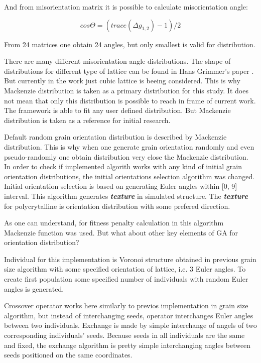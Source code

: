 \documentclass[12pt]{report}
\begin{document}
And from misorientation matrix it is possible to calculate misorientation angle:

\begin{equation} \label{misangle}
cos\Theta = (trace(\Delta g_{1,2}) - 1)/2
\end{equation}
\bigbreak

From 24 matrices one obtain 24 angles, but only smallest is valid for distribution.

There are many different misorientation angle distributions. The shape of distributions for different type of lattice can be found in Hans Grimmer's paper \cite{hans79}. But currently in the work just cubic lattice is beeing considered. This is why Mackenzie distribution \cite{mack58} is taken as a primary distribution for this study. It does not mean that only this distribution is possible to reach in frame of current work. The framework is able to fit any user defined distribution. But Mackenzie distribution is taken as a reference for initial research. 

Default random grain orientation distribution is described by Mackenzie distribution. This is why when one generate grain orientation randomly and even pseudo-randomly one obtain distribution very close the Mackenzie distribution. In order to check if implemented algorith works with any kind of initial grain orientation distributions, the initial orientations selection algorithm was changed. Initial orientation selection is based on generating Euler angles within [0\degree, 9\degree] interval. This algorithm generates \textit{\textbf{texture}} in simulated structure. The \textit{\textbf{texture}} for polycrytalline is orientation distribution with some prefered direction.

As one can understand, for fitness penalty calculation in this algorithm Mackenzie function was used. But what about other key elements of GA for orientation distribution? 

Individual for this implementation is Voronoi structure obtained in previous grain size algorithm with some specified orientation of lattice, i.e. 3 Euler angles. To create first population some specified number of individuals with random Euler angles is generated.

Crossover operator works here similarly to previos implementation in grain size algorithm, but instead of interchanging seeds, operator interchanges Euler angles between two individuals. Exchange is made by simple interchange of angels of two corresponding individuals' seeds. Because seeds in all individuals are the same and fixed, the exchange algorithm is pretty simple interchanging angles between seeds positioned on the same coordinates.
\end{document}
